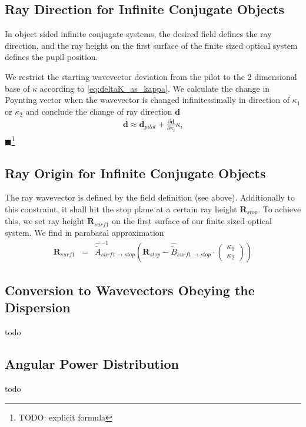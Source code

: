 \documentclass[12pt,a4paper,twoside,openright,BCOR10mm,headsepline,titlepage,abstracton,chapterprefix,final]{scrreprt}
\newcommand\Vector[1]{{\mathbf{#1}}}
\newcommand{\remark}[1]{{\color{red}$\blacksquare$}\footnote{{\color{red}#1}}}
\begin{document}
\subsection{Ray Direction for Infinite Conjugate Objects}
In object sided infinite conjugate systems, the desired field defines the ray direction, 
and the ray height on the first surface of the finite sized optical system defines the pupil position.

We restrict the starting wavevector deviation from the pilot to the 2 dimensional base of $\kappa$ according to \eqref{eq:deltaK_as_kappa}.
We calculate the change in Poynting vector when the wavevector is changed infinitessimally in direction of $\kappa_1$ or $\kappa_2$
and conclude the change of ray direction $\Vector{d}$
\begin{eqnarray}
 \Vector{d} \approx \Vector{d}_{pilot} + \frac{\partial \Vector{d}}{\partial \kappa_i} \kappa_i
\end{eqnarray}
\remark{TODO: explicit formula}


\subsection{Ray Origin for Infinite Conjugate Objects}
The ray wavevector is defined by the field definition (see above).
Additionally to this constraint, it shall hit the stop plane at a certain ray height $\Vector{R}_{stop}$.
To achieve this, we set ray height $\Vector{R}_{surf1}$ on the first surface of our finite sized optical system. 
We find in parabasal approximation
\begin{eqnarray}
 \Vector{R}_{surf1}                 
 &=&
 \hat{\tilde{A}}_{surf1\rightarrow stop}^{-1}
 \left(
   \Vector{R}_{stop} - \hat{\tilde{B}}_{surf1\rightarrow stop} \cdot \begin{pmatrix}\kappa_1 \\ \kappa_2\end{pmatrix}
 \right)
\end{eqnarray}

\subsection{Conversion to Wavevectors Obeying the Dispersion}
todo

\subsection{Angular Power Distribution}
todo
\end{document}

